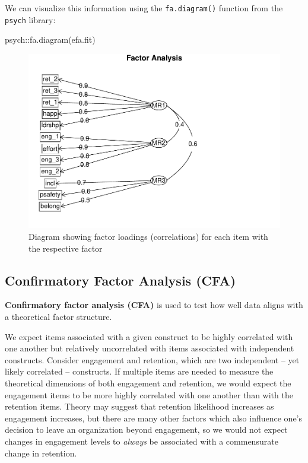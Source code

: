 \documentclass[
]{book}
\newenvironment{Shaded}{\begin{snugshade}}{\end{snugshade}}
\newcommand{\FunctionTok}[1]{\textcolor[rgb]{0.00,0.00,0.00}{#1}}
\newcommand{\NormalTok}[1]{#1}
\newcommand{\SpecialCharTok}[1]{\textcolor[rgb]{0.00,0.00,0.00}{#1}}
\begin{document}
We can visualize this information using the \texttt{fa.diagram()} function from the \texttt{psych} library:

\begin{Shaded}
\begin{Highlighting}[]
\NormalTok{psych}\SpecialCharTok{::}\FunctionTok{fa.diagram}\NormalTok{(efa.fit)}
\end{Highlighting}
\end{Shaded}

\begin{figure}

{\centering \includegraphics[width=1\linewidth]{The_Fundamentals_of_People_Analytics_files/figure-latex/fct-ld-diagram-1} 

}

\caption{Diagram showing factor loadings (correlations) for each item with the respective factor}\label{fig:fct-ld-diagram}
\end{figure}

\hypertarget{confirmatory-factor-analysis-cfa}{%
\subsection{Confirmatory Factor Analysis (CFA)}\label{confirmatory-factor-analysis-cfa}}

\textbf{Confirmatory factor analysis (CFA)} is used to test how well data aligns with a theoretical factor structure.

We expect items associated with a given construct to be highly correlated with one another but relatively uncorrelated with items associated with independent constructs. Consider engagement and retention, which are two independent -- yet likely correlated -- constructs. If multiple items are needed to measure the theoretical dimensions of both engagement and retention, we would expect the engagement items to be more highly correlated with one another than with the retention items. Theory may suggest that retention likelihood increases as engagement increases, but there are many other factors which also influence one's decision to leave an organization beyond engagement, so we would not expect changes in engagement levels to \emph{always} be associated with a commensurate change in retention.
\end{document}
